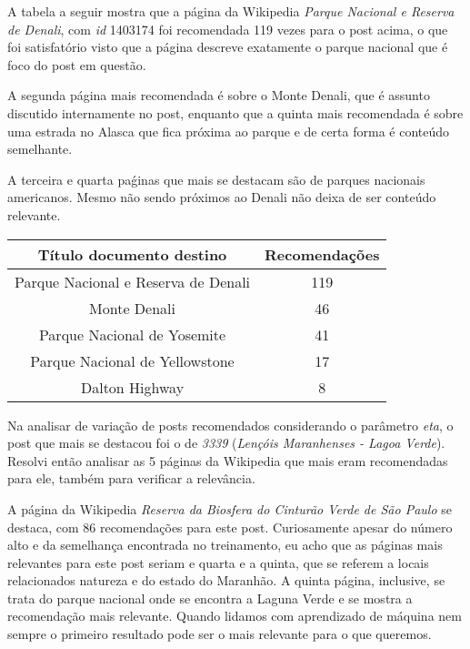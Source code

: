 A tabela a seguir mostra que a página da Wikipedia \textit{Parque Nacional e Reserva de Denali}, com \textit{id} 1403174 foi recomendada 119 vezes 
para o post acima, o que foi satisfatório visto que a página descreve exatamente o parque nacional que é foco do post em questão.

A segunda página mais recomendada é sobre o Monte Denali, que é assunto discutido internamente no post, enquanto que a quinta mais recomendada é 
sobre uma estrada no Alasca que fica próxima ao parque e de certa forma é conteúdo semelhante. 

A terceira e quarta paǵinas que mais se destacam são de parques nacionais americanos. Mesmo não sendo próximos ao Denali não deixa de ser conteúdo
relevante.

\begin{center}
    \begin{tabular}{|c|c|}
        \hline
        \textbf{Título documento destino} & \textbf{Recomendações} \\
        \hline
        Parque Nacional e Reserva de Denali & 119 \\
        \hline
        Monte Denali & 46 \\
        \hline
        Parque Nacional de Yosemite & 41 \\
        \hline
        Parque Nacional de Yellowstone & 17 \\
        \hline
        Dalton Highway & 8 \\
        \hline
    \end{tabular}
\end{center}

Na analisar de variação de posts recomendados considerando o parâmetro \textit{eta}, o post que mais se destacou foi o de \textit{3339} 
(\textit{Lençóis Maranhenses - Lagoa Verde}). Resolvi então analisar as 5 páginas da Wikipedia que mais eram recomendadas para ele, também para
verificar a relevância.

A página da Wikipedia \textit{Reserva da Biosfera do Cinturão Verde de São Paulo} se destaca, com 86 recomendações para este post. Curiosamente 
apesar do número alto e da semelhança encontrada no treinamento, eu acho que as páginas mais relevantes para este post seriam e quarta e a quinta, 
que se referem a locais relacionados natureza e do estado do Maranhão. A quinta página, inclusive, se trata do parque nacional onde se encontra 
a Laguna Verde e se mostra a recomendação mais relevante. Quando lidamos com aprendizado de máquina nem sempre o primeiro resultado pode ser 
o mais relevante para o que queremos.

